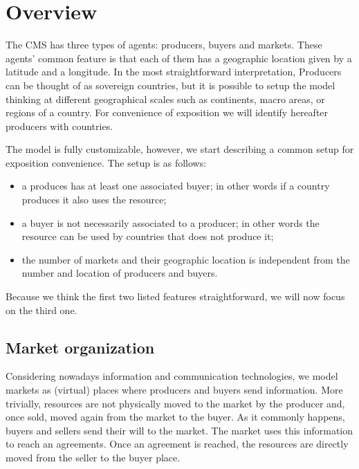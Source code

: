 \documentclass{article}
\begin{document}
\newpage
\thispagestyle{empty}

\null


\tableofcontents
 

\newpage






\printglossaries

\newpage

\section{Overview}

The CMS has three types of agents: producers, buyers and markets.
These agents' common feature is that each of them has a geographic location given by a latitude and a longitude. 
In the most straightforward interpretation, Producers can be thought of as sovereign countries, but it is possible to setup the model thinking at different geographical scales such as continents, macro areas, or regions of a country. For convenience of exposition we will identify hereafter producers with countries.

The model is fully customizable, however, we start describing a common setup for exposition convenience. The setup is as follows:
\begin{itemize}
	\item a produces has at least one associated buyer; in other words if a country produces it also uses the resource; 
	\item a buyer is not necessarily associated to a producer; in other words the resource can be used by countries that does not produce it;
	\item the number of markets and their geographic location is independent from the number and location of producers and buyers.
\end{itemize}
Because we think the first two listed features straightforward, we will now focus on the third one.
\subsection{Market organization}
Considering nowadays information and communication technologies, we model markets as (virtual) places where producers and buyers send information. More trivially, resources are not physically moved to the market by the producer and, once sold, moved again from the market to the buyer. As it commonly happens, buyers and sellers send their will to the market. The market uses this information to reach an agreements. Once an agreement is reached, the resources are directly moved from the seller to the buyer place.
\end{document}
